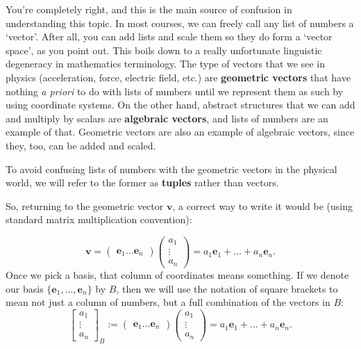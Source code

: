 \documentclass[../master.tex]{subfiles}
\begin{document}
	You're completely right, and this is the main source of confusion in understanding this topic. 
	In most courses, we can freely call any list of numbers a `vector'. After all, you can add lists and scale them so they do form a `vector space', as you point out. This boils down to a really unfortunate linguistic degeneracy in mathematics terminology. The type of vectors that we see in physics (acceleration, force, electric field, etc.) are \textbf{geometric vectors} that have nothing \emph{a priori} to do with lists of numbers until we represent them as such by using coordinate systems. On the other hand, abstract structures that we can add and multiply by scalars are \textbf{algebraic vectors}, and lists of numbers are an example of that. Geometric vectors are also an example of algebraic vectors, since they, too, can be added and scaled. 
	
	
	To avoid confusing lists of numbers with the geometric vectors in the physical world, we will refer to the former as \textbf{tuples} rather than vectors.
	
	
	So, returning to the geometric vector $\mathbf v$, a correct way to write it would be (using standard matrix multiplication convention):
	
	\begin{equation}\label{eq:Repv1}
		\mathbf v = \begin{pmatrix}
			\mathbf e_1  \dots \mathbf e_n
		\end{pmatrix}
		\begin{pmatrix}
			a_1 \\ \vdots \\a_n
		\end{pmatrix} 
		= a_1 \mathbf e_1 + \dots + a_n \mathbf e_n.
	\end{equation}	
	Once we pick a basis, that column of coordinates means something. If we denote our basis $\{\mathbf e_1, \dots, \mathbf e_n \}$ by $B$, then we will use the notation of square brackets to mean not just a column of numbers, but a full combination of the vectors in $B$:
	\begin{equation}\label{eq:Repv2}
		\begin{bmatrix} a_1 \\ \vdots \\a_n	\end{bmatrix}_B := \begin{pmatrix}
			\mathbf e_1  \dots \mathbf e_n
		\end{pmatrix}
		\begin{pmatrix}
			a_1 \\ \vdots \\a_n
		\end{pmatrix} = a_1 \mathbf e_1 + \dots + a_n \mathbf e_n.
	\end{equation}
	
\end{document}

